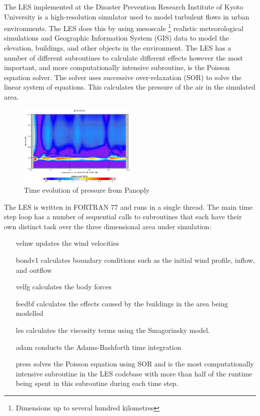 The LES implemented at the Disaster Prevention Research Institute of Kyoto
University is a high-resolution simulator used to model turbulent flows in urban
environments. The LES does this by using mesoscale \footnote{Dimensions up to
several hundred kilometres} realistic meteorological simulations and Geographic
Information System (GIS) data to model the elevation, buildings, and other
objects in the environment. The LES has a number of different subroutines to
calculate different effects however the most important, and more computationally
intensive subroutine, is the Poisson equation solver. The solver uses successive
over-relaxation (SOR) to solve the linear system of equations. This calculates
the pressure of the air in the simulated area.

\begin{figure}
    \includegraphics[width=0.5\textwidth]{graphs/pressure_in_LES_output_p.png}
    \caption{Time evolution of pressure from Panoply}
    \label{fig:lespressure}
\end{figure}

The LES is written in FORTRAN 77 and runs in a single thread. The main time step
loop has a number of sequential calls to subroutines that each have their own
distinct task over the three dimensional area under simulation:

\begin{itemize}[noitemsep,nolistsep]

    \item[velnw] updates the wind velocities

    \item[bondv1] calculates boundary conditions such as the initial wind
    profile, inflow, and outflow

    \item[velfg] calculates the body forces

    \item[feedbf] calculates the effects caused by the buildings in the area
    being modelled

    \item[les] calculates the viscosity terms using the Smagorinsky model.

    \item[adam] conducts the Adams-Bashforth time integration

    \item[press] solves the Poisson equation using SOR and is the most
    computationally intensive subroutine in the LES codebase with more than half
    of the runtime being spent in this subroutine during each time step.

\end{itemize}


